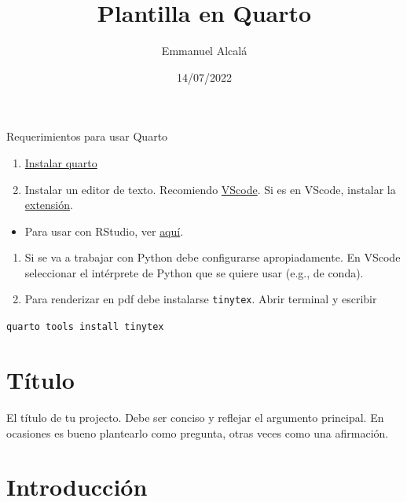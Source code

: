 \documentclass[
  letterpaper,
  DIV=11,
  numbers=noendperiod]{scrartcl}
\title{Plantilla en Quarto}
\author{Emmanuel Alcalá}
\date{14/07/2022}
\providecommand{\tightlist}{%
  \setlength{\itemsep}{0pt}\setlength{\parskip}{0pt}}\usepackage{longtable,booktabs,array}
\begin{document}
\maketitle
\ifdefined\Shaded\renewenvironment{Shaded}{\begin{tcolorbox}[breakable, boxrule=0pt, frame hidden, sharp corners, enhanced, interior hidden, borderline west={3pt}{0pt}{shadecolor}]}{\end{tcolorbox}}\fi

Requerimientos para usar Quarto

\begin{enumerate}
\def\labelenumi{\arabic{enumi}.}
\tightlist
\item
  \href{https://quarto.org/docs/get-started/}{Instalar quarto}
\item
  Instalar un editor de texto. Recomiendo
  \href{https://quarto.org/docs/get-started/hello/vscode.html}{VScode}.
  Si es en VScode, instalar la
  \href{https://marketplace.visualstudio.com/items?itemName=quarto.quarto}{extensión}.
\end{enumerate}

\begin{itemize}
\tightlist
\item
  Para usar con RStudio, ver
  \href{https://quarto.org/docs/get-started/hello/rstudio.html}{aquí}.
\end{itemize}

\begin{enumerate}
\def\labelenumi{\arabic{enumi}.}
\setcounter{enumi}{2}
\tightlist
\item
  Si se va a trabajar con Python debe configurarse apropiadamente. En
  VScode seleccionar el intérprete de Python que se quiere usar (e.g.,
  de conda).
\item
  Para renderizar en pdf debe instalarse \texttt{tinytex}. Abrir
  terminal y escribir
\end{enumerate}

\texttt{quarto\ tools\ install\ tinytex}

\hypertarget{tuxedtulo}{%
\section{Título}\label{tuxedtulo}}

El título de tu projecto. Debe ser conciso y reflejar el argumento
principal. En ocasiones es bueno plantearlo como pregunta, otras veces
como una afirmación.

\hypertarget{introducciuxf3n}{%
\section{Introducción}\label{introducciuxf3n}}
\end{document}
